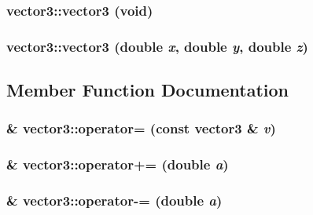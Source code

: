 \subsubsection{\setlength{\rightskip}{0pt plus 5cm}vector3::vector3 (void)\hspace{0.3cm}{\tt  [inline]}}\label{structvector3_9cc5c01ba835acaf8450eba934082b60}


\subsubsection{\setlength{\rightskip}{0pt plus 5cm}vector3::vector3 (double {\em x}, double {\em y}, double {\em z})\hspace{0.3cm}{\tt  [inline]}}\label{structvector3_c26d9c3a6c6cdf051570770815ed56cd}




\subsection{Member Function Documentation}
\subsubsection{\& vector3::operator= (const {\bf vector3} \& {\em v})\hspace{0.3cm}{\tt  [inline]}}\label{structvector3_926905b93ee84a3fe6fe431527fe963d}


\subsubsection{\& vector3::operator+= (double {\em a})\hspace{0.3cm}{\tt  [inline]}}\label{structvector3_c819a0b38b5482718079a0edc4706c76}


\subsubsection{\& vector3::operator-= (double {\em a})\hspace{0.3cm}{\tt  [inline]}}\label{structvector3_ab64d64ab09c7a9187174f3ebd05021a}


